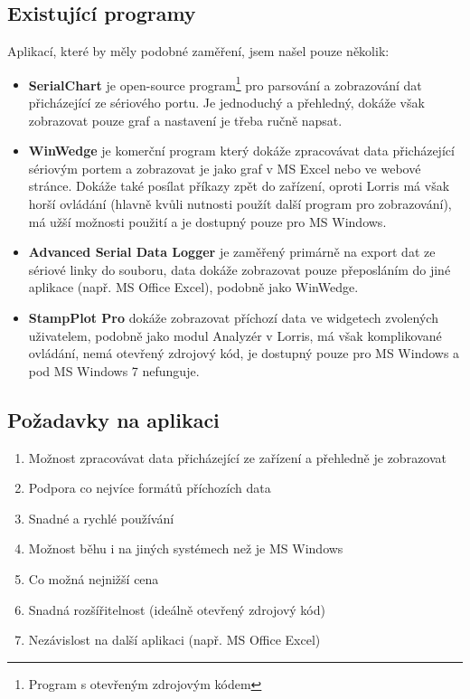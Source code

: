 \documentclass[12pt, a4paper, oneside]{article}
\begin{document}
\subsection*{Existující programy}
Aplikací, které by měly podobné zaměření, jsem našel pouze několik:

\begin{itemize}
    \item {\bf SerialChart}\cite{serialchart} je open-source program\footnote{Program s otevřeným zdrojovým kódem} pro parsování a zobrazování dat přicházející ze sériového portu. Je jednoduchý a přehledný, dokáže však zobrazovat pouze graf a nastavení je třeba ručně napsat.
    \item {\bf WinWedge}\cite{winwedge} je komerční program který dokáže zpracovávat data přicházející sériovým portem a zobrazovat je jako graf v MS Excel nebo ve webové stránce. Dokáže také posílat příkazy zpět do zařízení, oproti Lorris má však horší ovládání (hlavně kvůli nutnosti použít další program pro zobrazování), má užší možnosti použití a je dostupný pouze pro MS Windows.
    \item {\bf Advanced Serial Data Logger}\cite{serialdatalogger} je zaměřený primárně na export dat ze sériové linky do souboru, data dokáže zobrazovat pouze přeposláním do jiné aplikace (např. MS Office Excel), podobně jako WinWedge.
    \item {\bf StampPlot Pro}\cite{stamplot} dokáže zobrazovat příchozí data ve widgetech zvolených uživatelem, podobně jako modul Analyzér v Lorris, má však komplikované ovládání, nemá otevřený zdrojový kód, je dostupný pouze pro MS Windows a pod MS Windows 7 nefunguje.
\end{itemize}

\subsection*{Požadavky na aplikaci}
\begin{enumerate}
    \item Možnost zpracovávat data přicházející ze zařízení a přehledně je zobrazovat %
    \item Podpora co nejvíce formátů příchozích data %
    \item Snadné a rychlé používání %
    \item Možnost běhu i na jiných systémech než je MS Windows %
    \item Co možná nejnižší cena %
    \item Snadná rozšířitelnost (ideálně otevřený zdrojový kód) %
    \item Nezávislost na další aplikaci (např. MS Office Excel) %
\end{enumerate}
\end{document}
